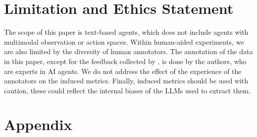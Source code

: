 \documentclass{article} %
\begin{document}





\section*{Limitation and Ethics Statement}
The scope of this paper is text-based agents, which does not include agents with multimodal observation or action spaces. Within human-aided experiments, we are also limited by the diversity of human annotators. The annotation of the data in this paper, except for the feedback collected by \citet{shao2024collaborative}, is done by the authors, who are experts in AI agents. We do not address the effect of the experience of the annotators on the induced metrics. Finally, induced metrics should be used with caution, these could reflect the internal biases of the LLMs used to extract them. 






\appendix
\section{Appendix}

\end{document}

